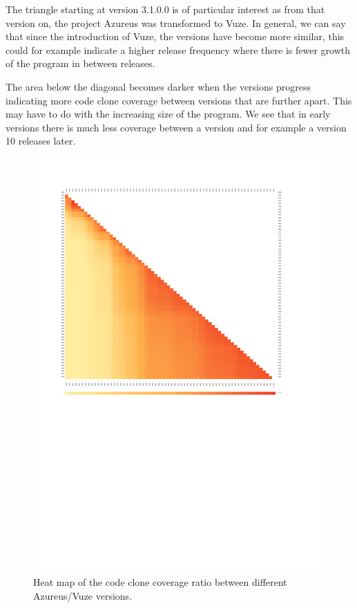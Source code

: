 \documentclass[a4paper,twoside, twocolumn, 11pt]{article}
\numberwithin{equation}{section}
\begin{document}
The triangle starting at version 3.1.0.0 is of particular interest as from that version on, the project Azureus was transformed to Vuze.
In general, we can say that since the introduction of Vuze, the versions have become more similar, this could for example indicate a higher release frequency where there is fewer growth of the program in between releases.

The area below the diagonal becomes darker when the versions progress indicating more code clone coverage between versions that are further apart.
This may have to do with the increasing size of the program. 
We see that in early versions there is much less coverage between a version and for example a version 10 releases later.


\begin{figure}
\center
\includegraphics[width=\textwidth]{first66min-max.pdf}
\caption{Heat map of the code clone coverage ratio between different Azureus/Vuze versions.}
\label{fig:min-max}
\end{figure}
\end{document}
